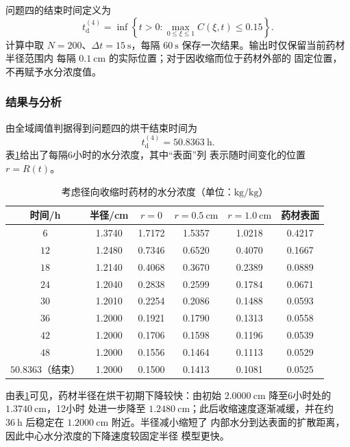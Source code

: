 \documentclass[12pt,a4paper]{article}
\renewcommand{\boxed}[1]{#1}
\begin{document}
问题四的结束时间定义为
\begin{equation}
\boxed{
t_{\mathrm d}^{(4)}
=\inf\left\{t>0:
\max_{0\leq\xi\leq1}C(\xi,t)\leq0.15\right\}
}.
\label{eq:q4-dry-time}
\end{equation}
计算中取 $N=200$、$\Delta t=15\ \mathrm{s}$，每隔
$60\ \mathrm{s}$ 保存一次结果。输出时仅保留当前药材半径范围内
每隔 $0.1\ \mathrm{cm}$ 的实际位置；对于因收缩而位于药材外部的
固定位置，不再赋予水分浓度值。

\subsubsection{结果与分析}

由全域阈值判据得到问题四的烘干结束时间为
\begin{equation}
\boxed{t_{\mathrm d}^{(4)}=50.8363\ \mathrm{h}}.
\label{eq:q4-result-time}
\end{equation}
表\ref{tab:q4-moisture}给出了每隔6小时的水分浓度，其中“表面”列
表示随时间变化的位置 $r=R(t)$。

\begin{table}[H]
\centering
\caption{考虑径向收缩时药材的水分浓度（单位：$\mathrm{kg/kg}$）}
\label{tab:q4-moisture}
\begin{tabular}{cccccc}
\toprule
时间/h & 半径/cm & $r=0$ & $r=0.5\ \mathrm{cm}$
& $r=1.0\ \mathrm{cm}$ & 药材表面\\
\midrule
$6$  & 1.3740 & 1.7172 & 1.5357 & 1.0218 & 0.4217\\
$12$ & 1.2480 & 0.7346 & 0.6520 & 0.4070 & 0.1667\\
$18$ & 1.2140 & 0.4068 & 0.3670 & 0.2389 & 0.0889\\
$24$ & 1.2040 & 0.2838 & 0.2599 & 0.1784 & 0.0671\\
$30$ & 1.2010 & 0.2254 & 0.2086 & 0.1488 & 0.0593\\
$36$ & 1.2000 & 0.1921 & 0.1790 & 0.1313 & 0.0558\\
$42$ & 1.2000 & 0.1706 & 0.1598 & 0.1196 & 0.0539\\
$48$ & 1.2000 & 0.1556 & 0.1464 & 0.1113 & 0.0529\\
$50.8363$（结束） & 1.2000 & 0.1500 & 0.1413 & 0.1081 & 0.0525\\
\bottomrule
\end{tabular}
\end{table}

由表\ref{tab:q4-moisture}可见，药材半径在烘干初期下降较快：由初始
$2.0000\ \mathrm{cm}$ 降至6小时处的 $1.3740\ \mathrm{cm}$，12小时
处进一步降至 $1.2480\ \mathrm{cm}$；此后收缩速度逐渐减缓，并在约
$36\ \mathrm{h}$ 后稳定在 $1.2000\ \mathrm{cm}$ 附近。半径减小缩短了
内部水分到达表面的扩散距离，因此中心水分浓度的下降速度较固定半径
模型更快。
\end{document}
